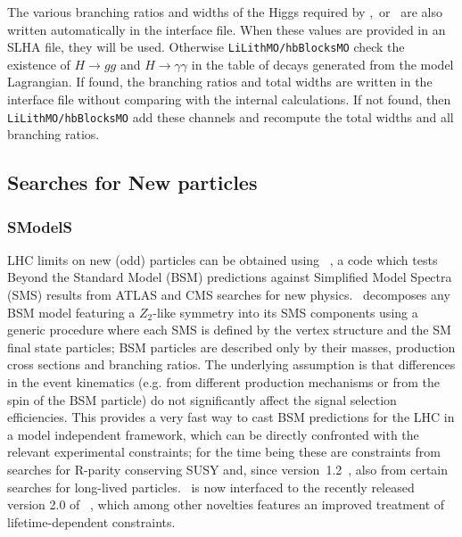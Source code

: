 \documentclass[12pt,a4paper]{article}
\begin{document}
The various branching ratios and widths of the Higgs required by   \HB,\HS\ or  \lilith\ are also written automatically in the interface file. When these 
values  are provided in an SLHA file, they will be used. Otherwise {\tt LiLithMO/hbBlocksMO}  check  the existence
of $H\rightarrow gg$  and $H\rightarrow \gamma\gamma$  in the table of decays generated from the model Lagrangian. If found, the branching ratios and total widths are written in the  interface file without comparing  with the internal calculations. If not found, then {\tt LiLithMO/hbBlocksMO} add these channels and  recompute the total widths and all branching ratios.




\subsection{Searches for New particles}

\subsubsection{SModelS}

LHC limits on new (odd) particles can be obtained using \smodels~\cite{Kraml:2013mwa,Ambrogi:2017neo,Ambrogi:2018ujg,smodels20}, 
a code which tests Beyond the Standard Model (BSM) predictions against Simplified Model Spectra (SMS) 
results from ATLAS and CMS searches for new physics.
\smodels\ decomposes any BSM model featuring a ${Z}_2$-like symmetry into its SMS components 
using a generic procedure where each SMS is defined by the vertex structure and the SM final state particles; BSM particles are described only by their masses, production cross sections and branching ratios. 
The underlying assumption is that differences in the event kinematics (e.g. from different production mechanisms or from the spin of the BSM particle) do not significantly affect the signal selection efficiencies. 
This provides a very fast way to cast BSM predictions for the LHC in a model independent framework, which can be directly confronted with the relevant experimental constraints; for the time being these are constraints from searches for R-parity conserving SUSY and, since version~1.2~\cite{Heisig:2018kfq,Ambrogi:2018ujg}, also from certain searches for long-lived particles. \micro\ is now interfaced to the recently released version 2.0 of \smodels~\cite{smodels20}, which among other novelties features an improved treatment of lifetime-dependent constraints. 
\end{document}
